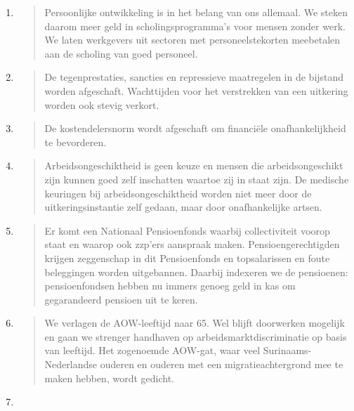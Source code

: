 \begin{enumerate}
\def\labelenumi{\arabic{enumi}.}
\item
  \begin{quote}
  Persoonlijke ontwikkeling is in het belang van ons allemaal. We steken
  daarom meer geld in scholingsprogramma's voor mensen zonder werk. We
  laten werkgevers uit sectoren met personeelstekorten meebetalen aan de
  scholing van goed personeel.
  \end{quote}
\item
  \begin{quote}
  De tegenprestaties, sancties en repressieve maatregelen in de bijstand
  worden afgeschaft. Wachttijden voor het verstrekken van een uitkering
  worden ook stevig verkort.
  \end{quote}
\item
  \begin{quote}
  De kostendelersnorm wordt afgeschaft om financiële onafhankelijkheid
  te bevorderen.
  \end{quote}
\item
  \begin{quote}
  Arbeidsongeschiktheid is geen keuze en mensen die arbeidsongeschikt
  zijn kunnen goed zelf inschatten waartoe zij in staat zijn. De
  medische keuringen bij arbeidsongeschiktheid worden niet meer door de
  uitkeringsinstantie zelf gedaan, maar door onafhankelijke artsen.
  \end{quote}
\item
  \begin{quote}
  Er komt een Nationaal Pensioenfonds waarbij collectiviteit voorop
  staat en waarop ook zzp'ers aanspraak maken. Pensioengerechtigden
  krijgen zeggenschap in dit Pensioenfonds en topsalarissen en foute
  beleggingen worden uitgebannen. Daarbij indexeren we de pensioenen:
  pensioenfondsen hebben nu immers genoeg geld in kas om gegarandeerd
  pensioen uit te keren.
  \end{quote}
\item
  \begin{quote}
  We verlagen de AOW-leeftijd naar 65. Wel blijft doorwerken mogelijk en
  gaan we strenger handhaven op arbeidsmarktdiscriminatie op basis van
  leeftijd. Het zogenoemde AOW-gat, waar veel Surinaams-Nederlandse
  ouderen en ouderen met een migratieachtergrond mee te maken hebben,
  wordt gedicht.
  \end{quote}
\item
\end{enumerate}

